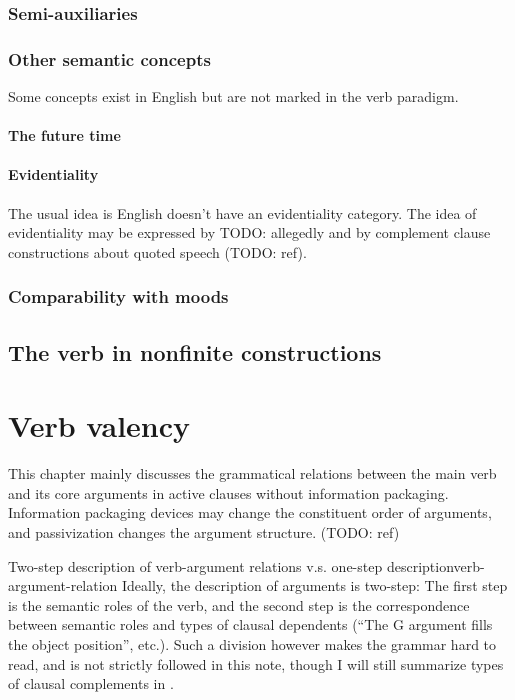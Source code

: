 \documentclass[UTF8, a4paper, oneside, scheme=plain]{ctexrep}
\begin{document}
\subsection{Semi-auxiliaries}\label{sec:semi-auxiliary}

\subsection{Other semantic concepts}

Some concepts exist in English but are not marked in the verb paradigm.

\subsubsection{The future time}\label{sec:future}

\subsubsection{Evidentiality}

The usual idea is English doesn't have an evidentiality category.
The idea of evidentiality may be expressed by TODO: allegedly 
and by complement clause constructions about quoted speech (TODO: ref).

\subsection{Comparability with moods}\label{sec:tam-mood-compatibility}

\section{The verb in nonfinite constructions}

\chapter{Verb valency}

This chapter mainly discusses the grammatical relations between the main verb and its core arguments 
in active clauses without information packaging.
Information packaging devices may change the constituent order of arguments,
and passivization changes the argument structure. (TODO: ref)

\begin{infobox}{Two-step description of verb-argument relations v.s. one-step description}{verb-argument-relation}
    Ideally, the description of arguments is two-step:
    The first step is the semantic roles of the verb,
    and the second step is the correspondence between semantic roles 
    and types of clausal dependents
    (``The G argument fills the object position'', etc.).
    Such a division however makes the grammar hard to read,
    and is not strictly followed in this note,
    though I will still summarize types of clausal complements in .
\end{infobox}
\end{document}
